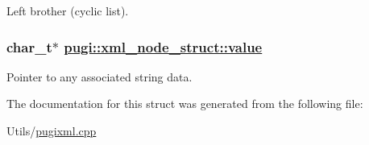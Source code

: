 Left brother (cyclic list). 

\hypertarget{structpugi_1_1xml__node__struct_191e708864fccda17bb66157afdadd2d}{
\subsubsection[value]{\setlength{\rightskip}{0pt plus 5cm}char\_\-t$\ast$ \hyperlink{structpugi_1_1xml__node__struct_191e708864fccda17bb66157afdadd2d}{pugi::xml\_\-node\_\-struct::value}}}
\label{structpugi_1_1xml__node__struct_191e708864fccda17bb66157afdadd2d}


Pointer to any associated string data. 



The documentation for this struct was generated from the following file:\begin{CompactItemize}
\item 
Utils/\hyperlink{pugixml_8cpp}{pugixml.cpp}\end{CompactItemize}
